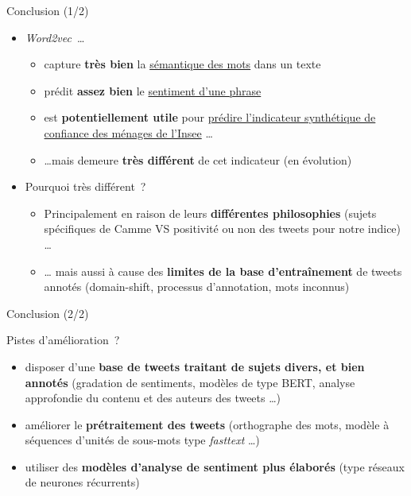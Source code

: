 \documentclass[10pt,xcolor=table,color={dvipsnames,usenames},ignorenonframetext,usepdftitle=false,french]{beamer}
\providecommand{\tightlist}{%
  \setlength{\parskip}{0pt}
  }
\begin{document}
\begin{frame}{Conclusion (1/2)}
\protect\hypertarget{conclusion-12}{}

\begin{itemize}
\tightlist
\item
  \emph{Word2vec}~\dots

  \begin{itemize}
  \tightlist
  \item
    capture \textbf{très bien} la \underline{sémantique des mots} dans
    un texte
  \item
    prédit \textbf{assez bien} le \underline{sentiment d’une phrase}
  \item
    est \textbf{potentiellement utile} pour
    \underline{prédire l’indicateur synthétique de}
    \underline{confiance des ménages de l’Insee} \dots
  \item
    \dots mais demeure \textbf{très différent} de cet indicateur (en
    évolution)
  \end{itemize}
\end{itemize}

\bigskip

\pause

\begin{itemize}
\tightlist
\item
  Pourquoi très différent~?

  \begin{itemize}
  \tightlist
  \item
    Principalement en raison de leurs \textbf{différentes philosophies}
    \footnotesize (sujets spécifiques de Camme VS positivité ou non des
    tweets pour notre indice) \normalsize \dots
  \item
    \dots{} mais aussi à cause des \textbf{limites de la base
    d'entraînement} de tweets annotés \footnotesize (domain-shift,
    processus d'annotation, mots inconnus) \normalsize
  \end{itemize}
\end{itemize}

\end{frame}

\begin{frame}{Conclusion (2/2)}
\protect\hypertarget{conclusion-22}{}

Pistes d'amélioration~?

\begin{itemize}
\item
  disposer d'une \textbf{base de tweets traitant de sujets divers, et
  bien annotés} \footnotesize (gradation de sentiments, modèles de type
  BERT, analyse approfondie du contenu et des auteurs des tweets \dots)
  \normalsize
\item
  améliorer le \textbf{prétraitement des tweets}
  \footnotesize (orthographe des mots, modèle à séquences d'unités de
  sous-mots type \emph{fasttext} \dots)\normalsize
\item
  utiliser des \textbf{modèles d'analyse de sentiment plus élaborés}
  \footnotesize  (type réseaux de neurones récurrents)\normalsize
\end{itemize}

\end{frame}
\end{document}
